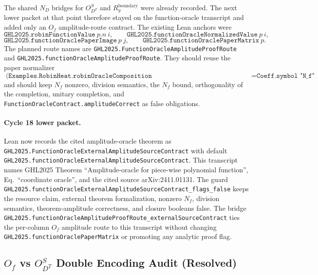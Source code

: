 The shared \(N_D\) bridges for \(O_{D^T}^S\) and
\(R_y^{\mathrm{boundary}}\) were already recorded.  The next lower packet at
that point therefore stayed on the function-oracle transcript and added only
an \(O_f\) amplitude-route contract.  The existing Lean anchors were
\[
  \texttt{GHL2025.robinFunctionValue}\ p.n\ i,\qquad
  \texttt{GHL2025.functionOracleNormalizedValue}\ p\ i,
\]
\[
  \texttt{GHL2025.functionOraclePaperImage}\ p\ j,\qquad
  \texttt{GHL2025.functionOraclePaperMatrix}\ p .
\]
The planned route names are
\texttt{GHL2025.FunctionOracleAmplitudeProofRoute} and
\texttt{GHL2025.functionOracleAmplitudeProofRoute}.  They should reuse the
paper normalizer
\[
  \texttt{(Examples.RobinHeat.robinOracleComposition n).functionOracle.normalizerBound}
  = \texttt{Coeff.symbol "N\_f"}
\]
and should keep \(N_f\) nonzero, division semantics, the \(N_f\) bound,
orthogonality of the completion, unitary completion, and
\texttt{FunctionOracleContract.amplitudeCorrect} as false obligations.

\paragraph{Cycle 18 lower packet.}
Lean now records the cited amplitude-oracle theorem as
\texttt{GHL2025.FunctionOracleExternalAmplitudeSourceContract} with default
\texttt{GHL2025.functionOracleExternalAmplitudeSourceContract}.  This transcript
names GHL2025 Theorem ``Amplitude-oracle for piece-wise polynomial function'',
Eq.~``coordinate oracle'', and the cited source arXiv:2411.01131.  The guard
\texttt{GHL2025.functionOracleExternalAmplitudeSourceContract\_flags\_false}
keeps the resource claim, external theorem formalization, nonzero \(N_f\),
division semantics, theorem-amplitude correctness, and closure booleans false.
The bridge
\texttt{GHL2025.functionOracleAmplitudeProofRoute\_externalSourceContract}
ties the per-column \(O_f\) amplitude route to this transcript without changing
\texttt{GHL2025.functionOraclePaperMatrix} or promoting any analytic proof flag.

\subsection{$O_f$ vs $O_{D^T}^S$ Double Encoding Audit (Resolved)}

